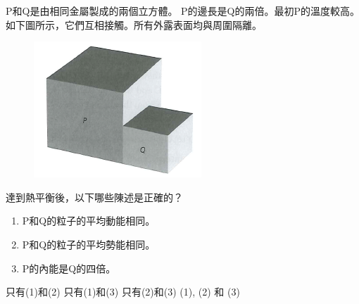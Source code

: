 {
    P和Q是由相同金屬製成的兩個立方體。 P的邊長是Q的兩倍。最初P的溫度較高。如下圖所示，它們互相接觸。所有外露表面均與周圍隔離。
    \begin{figure}[h]
        \centering
        \includegraphics[width=0.4\linewidth]{assets/MCQ2.png}
    \end{figure}
    \par 達到熱平衡後，以下哪些陳述是正確的？
    \medskip
    \begin{enumerate}[label=\sd]
        \item P和Q的粒子的平均動能相同。
        \item P和Q的粒子的平均勢能相同。
        \item P的內能是Q的四倍。
    \end{enumerate}
    \begin{choices}
        \CorrectChoice 只有(1)和(2)
        \choice 只有(1)和(3)
        \choice 只有(2)和(3)
        \choice (1), (2) 和 (3)
    \end{choices}
}{}

